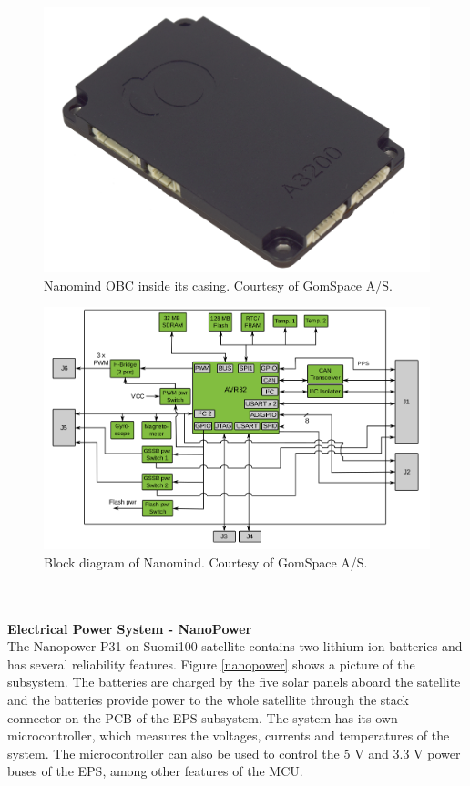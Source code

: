 \documentclass[english,12pt,a4paper,pdftex,elec,utf8]{aaltothesis}
\begin{document}
\\
\begin{figure}[h!]
\centering
\includegraphics[scale=0.2]{nanomind}
\caption{Nanomind OBC inside its casing. Courtesy of GomSpace A/S. \cite{nanomindds}}
\label{nanomind}
\end{figure}
\begin{figure}[h!]
\centering
\includegraphics[scale=0.4]{nanomind_block}
\caption{Block diagram of Nanomind. Courtesy of GomSpace A/S. \cite{nanomindds}}
\label{nanomindblock}
\end{figure}
\\
\\
\textbf{Electrical Power System - NanoPower}\\
The Nanopower P31 on Suomi100 satellite contains two lithium-ion batteries and has several reliability features. Figure \ref{nanopower} shows a picture of the subsystem. The batteries are charged by the five solar panels aboard the satellite and the batteries provide power to the whole satellite through the stack connector on the PCB of the EPS subsystem. The system has its own microcontroller, which measures the voltages, currents and temperatures of the system. The microcontroller can also be used to control the 5 V and 3.3 V power buses of the EPS, among other features of the MCU. \cite{nanopowerds}\\
\end{document}
